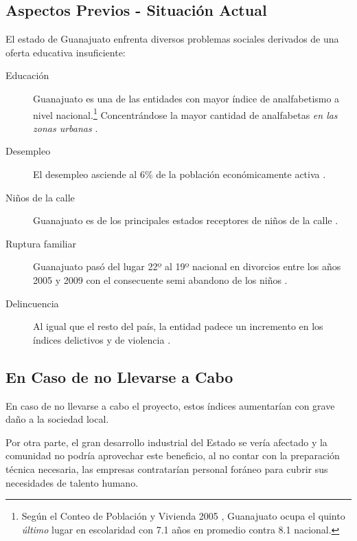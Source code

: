 \subsection{Aspectos Previos - Situación Actual}
\label{sub:Intro:AspectosPrevios}

El estado de Guanajuato enfrenta diversos problemas sociales derivados de una oferta educativa insuficiente:

\begin{description}
	\item[Educación] Guanajuato es una de las entidades con mayor índice de analfabetismo a nivel nacional.\footnote{Según el Conteo de Población y Vivienda 2005 \citep{Inegi2005}, Guanajuato ocupa el quinto \emph{último} lugar en escolaridad con 7.1 años en promedio contra 8.1 nacional.} Concentrándose la mayor cantidad de analfabetas \emph{en las zonas urbanas} \citep{Morales09}.
	\item[Desempleo] El desempleo asciende al 6\% de la población económicamente activa \citep{Inegi2010Enoe}.
	\item[Niños de la calle] Guanajuato es de los principales estados receptores de niños de la calle \citep{Morales09}.
	\item[Ruptura familiar]
	Guanajuato pasó del lugar 22º al 19º nacional en divorcios entre los años 2005 y 2009 \citep{Inegi2005pGto,Inegi2009pGto} con el consecuente semi abandono de los niños \citep{Morales09}.
	\item[Delincuencia] Al igual que el resto del país, la entidad padece un incremento en los índices delictivos y de violencia \citep{CIDE2010}.
\end{description}

\subsection{En Caso de no Llevarse a Cabo}

En caso de no llevarse a cabo el proyecto, estos índices aumentarían con grave daño a la sociedad local.

Por otra parte, el gran desarrollo industrial del Estado se vería afectado y la comunidad no podría aprovechar este beneficio, al no contar con la preparación técnica necesaria, las empresas contratarían personal foráneo para cubrir sus necesidades de talento humano.

